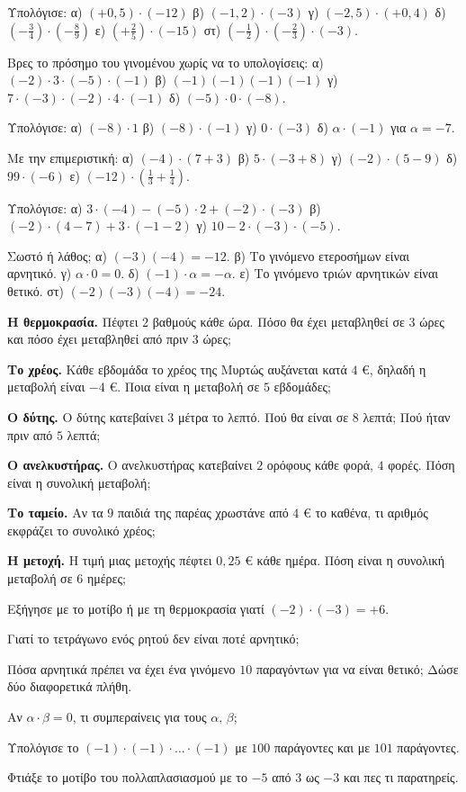 \ex Υπολόγισε: α) $(+0{,}5)\cdot(-12)$ \quad β) $(-1{,}2)\cdot(-3)$ \quad γ) $(-2{,}5)\cdot(+0{,}4)$ \quad δ) $\left(-\frac{3}{4}\right)\cdot\left(-\frac{8}{9}\right)$ \quad ε) $\left(+\frac{2}{5}\right)\cdot(-15)$ \quad στ) $\left(-\frac{1}{2}\right)\cdot\left(-\frac{2}{3}\right)\cdot(-3)$.

\ex Βρες το πρόσημο του γινομένου χωρίς να το υπολογίσεις: α) $(-2)\cdot3\cdot(-5)\cdot(-1)$ \quad β) $(-1)(-1)(-1)(-1)$ \quad γ) $7\cdot(-3)\cdot(-2)\cdot4\cdot(-1)$ \quad δ) $(-5)\cdot0\cdot(-8)$.

\ex Υπολόγισε: α) $(-8)\cdot1$ \quad β) $(-8)\cdot(-1)$ \quad γ) $0\cdot(-3)$ \quad δ) $\alpha\cdot(-1)$ για $\alpha=-7$.

\ex Με την επιμεριστική: α) $(-4)\cdot(7+3)$ \quad β) $5\cdot(-3+8)$ \quad γ) $(-2)\cdot(5-9)$ \quad δ) $99\cdot(-6)$ \quad ε) $(-12)\cdot\left(\frac{1}{3}+\frac{1}{4}\right)$.

\ex Υπολόγισε: α) $3\cdot(-4)-(-5)\cdot2+(-2)\cdot(-3)$ \quad β) $(-2)\cdot(4-7)+3\cdot(-1-2)$ \quad γ) $10-2\cdot(-3)\cdot(-5)$.

\ex Σωστό ή λάθος; α) $(-3)(-4)=-12$. \quad β) Το γινόμενο ετεροσήμων είναι αρνητικό. \quad γ) $\alpha\cdot0=0$. \quad δ) $(-1)\cdot\alpha=-\alpha$. \quad ε) Το γινόμενο τριών αρνητικών είναι θετικό. \quad στ) $(-2)(-3)(-4)=-24$.


\ex \textbf{Η θερμοκρασία.} Πέφτει $2$ βαθμούς κάθε ώρα. Πόσο θα έχει μεταβληθεί σε $3$ ώρες και πόσο έχει μεταβληθεί από πριν $3$ ώρες;

\ex \textbf{Το χρέος.} Κάθε εβδομάδα το χρέος της Μυρτώς αυξάνεται κατά $4$ €, δηλαδή η μεταβολή είναι $-4$ €. Ποια είναι η μεταβολή σε $5$ εβδομάδες;

\ex \textbf{Ο δύτης.} Ο δύτης κατεβαίνει $3$ μέτρα το λεπτό. Πού θα είναι σε $8$ λεπτά; Πού ήταν πριν από $5$ λεπτά;

\ex \textbf{Ο ανελκυστήρας.} Ο ανελκυστήρας κατεβαίνει $2$ ορόφους κάθε φορά, $4$ φορές. Πόση είναι η συνολική μεταβολή;

\ex \textbf{Το ταμείο.} Αν τα $9$ παιδιά της παρέας χρωστάνε από $4$ € το καθένα, τι αριθμός εκφράζει το συνολικό χρέος;

\ex \textbf{Η μετοχή.} Η τιμή μιας μετοχής πέφτει $0{,}25$ € κάθε ημέρα. Πόση είναι η συνολική μεταβολή σε $6$ ημέρες;


\ex Εξήγησε με το μοτίβο ή με τη θερμοκρασία γιατί $(-2)\cdot(-3)=+6$.

\ex Γιατί το τετράγωνο ενός ρητού δεν είναι ποτέ αρνητικό;

\ex Πόσα αρνητικά πρέπει να έχει ένα γινόμενο $10$ παραγόντων για να είναι θετικό; Δώσε δύο διαφορετικά πλήθη.

\ex Αν $\alpha\cdot\beta=0$, τι συμπεραίνεις για τους $\alpha,\,\beta$;

\ex Υπολόγισε το $(-1)\cdot(-1)\cdot\ldots\cdot(-1)$ με $100$ παράγοντες και με $101$ παράγοντες.


\ex Φτιάξε το μοτίβο του πολλαπλασιασμού με το $-5$ από $3$ ως $-3$ και πες τι παρατηρείς.
